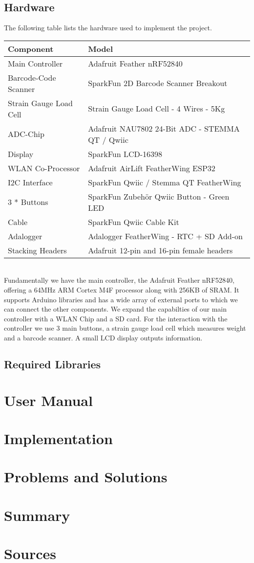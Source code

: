 \documentclass{article}
\begin{document}
\subsection{Hardware}
The following table lists the hardware used to implement the project.
\\[10pt]
\begin{tabular}{l l}
	\hline
	Component              & Model\\
	\hline
	Main Controller        & Adafruit Feather nRF52840\\
	Barcode-Code Scanner   & SparkFun 2D Barcode Scanner Breakout\\
	Strain Gauge Load Cell & Strain Gauge Load Cell - 4 Wires - 5Kg\\
	ADC-Chip               & Adafruit NAU7802 24-Bit ADC - STEMMA QT / Qwiic\\
	Display                & SparkFun LCD-16398\\
	WLAN Co-Processor      & Adafruit AirLift FeatherWing ESP32\\
	I2C Interface          & SparkFun Qwiic / Stemma QT FeatherWing\\
	3 * Buttons            & SparkFun Zubehör Qwiic Button - Green LED\\
	Cable                  & SparkFun Qwiic Cable Kit\\
	Adalogger              & Adalogger FeatherWing - RTC + SD Add-on\\
	Stacking Headers       & Adafruit 12-pin and 16-pin female headers\\
	\hline
\end{tabular} \\[10pt]
Fundamentally we have the main controller, the Adafruit Feather nRF52840, offering a 64MHz ARM Cortex M4F processor along with 256KB of SRAM.
It supports Arduino libraries and has a wide array of external ports to which we can connect the other components.
We expand the capabilties of our main controller with a WLAN Chip and a SD card.
For the interaction with the controller we use 3 main buttons, a strain gauge load cell which measures weight and a barcode scanner.
A small LCD display outputs information. 
\subsection{Required Libraries}
\section{User Manual}

\section{Implementation}

\section{Problems and Solutions}

\section{Summary}

\section{Sources}





\end{document}
